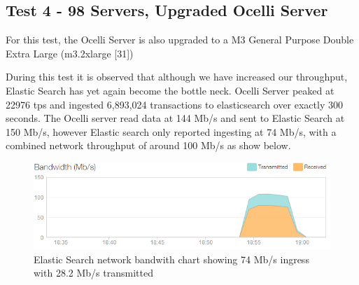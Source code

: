 \documentclass{llncs}
\begin{document}
\subsection{Test 4 - 98 Servers, Upgraded Ocelli Server}

For this test, the Ocelli Server is also upgraded to a M3 General Purpose Double Extra Large (m3.2xlarge [31])

During this test it is observed that although we have increased our throughput, Elastic Search has yet again become the bottle neck. Ocelli Server peaked at 22976 tps and ingested 6,893,024 transactions to elasticsearch over exactly 300 seconds. The Ocelli server read data at 144 Mb/s and sent to Elastic Search at 150 Mb/s, however Elastic search only reported ingesting at 74 Mb/s, with a combined network throughput of around 100 Mb/s as show below.

\begin{figure}[h]
    \centering
    \includegraphics[scale=0.7]{app15}
    \caption{Elastic Search network bandwith chart showing 74 Mb/s ingress with 28.2 Mb/s transmitted}
    \label{fig:ocelli_dm}
\end{figure}
\end{document}
